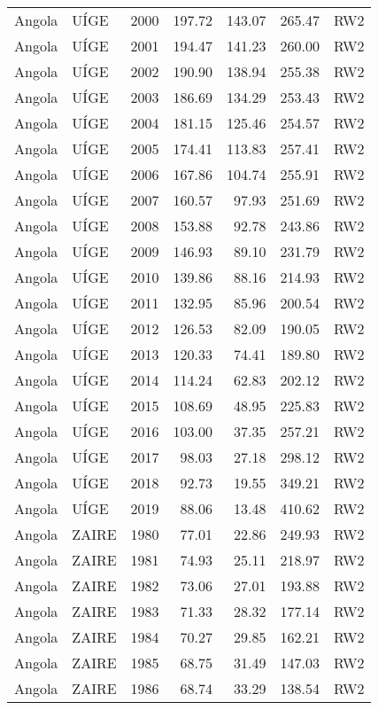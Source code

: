\begin{longtable}{lllrrrl}
  Angola & UÍGE & 2000 & 197.72 & 143.07 & 265.47 & RW2 \\ 
  Angola & UÍGE & 2001 & 194.47 & 141.23 & 260.00 & RW2 \\ 
  Angola & UÍGE & 2002 & 190.90 & 138.94 & 255.38 & RW2 \\ 
  Angola & UÍGE & 2003 & 186.69 & 134.29 & 253.43 & RW2 \\ 
  Angola & UÍGE & 2004 & 181.15 & 125.46 & 254.57 & RW2 \\ 
  Angola & UÍGE & 2005 & 174.41 & 113.83 & 257.41 & RW2 \\ 
  Angola & UÍGE & 2006 & 167.86 & 104.74 & 255.91 & RW2 \\ 
  Angola & UÍGE & 2007 & 160.57 & 97.93 & 251.69 & RW2 \\ 
  Angola & UÍGE & 2008 & 153.88 & 92.78 & 243.86 & RW2 \\ 
  Angola & UÍGE & 2009 & 146.93 & 89.10 & 231.79 & RW2 \\ 
  Angola & UÍGE & 2010 & 139.86 & 88.16 & 214.93 & RW2 \\ 
  Angola & UÍGE & 2011 & 132.95 & 85.96 & 200.54 & RW2 \\ 
  Angola & UÍGE & 2012 & 126.53 & 82.09 & 190.05 & RW2 \\ 
  Angola & UÍGE & 2013 & 120.33 & 74.41 & 189.80 & RW2 \\ 
  Angola & UÍGE & 2014 & 114.24 & 62.83 & 202.12 & RW2 \\ 
  Angola & UÍGE & 2015 & 108.69 & 48.95 & 225.83 & RW2 \\ 
  Angola & UÍGE & 2016 & 103.00 & 37.35 & 257.21 & RW2 \\ 
  Angola & UÍGE & 2017 & 98.03 & 27.18 & 298.12 & RW2 \\ 
  Angola & UÍGE & 2018 & 92.73 & 19.55 & 349.21 & RW2 \\ 
  Angola & UÍGE & 2019 & 88.06 & 13.48 & 410.62 & RW2 \\ 
  Angola & ZAIRE & 1980 & 77.01 & 22.86 & 249.93 & RW2 \\ 
  Angola & ZAIRE & 1981 & 74.93 & 25.11 & 218.97 & RW2 \\ 
  Angola & ZAIRE & 1982 & 73.06 & 27.01 & 193.88 & RW2 \\ 
  Angola & ZAIRE & 1983 & 71.33 & 28.32 & 177.14 & RW2 \\ 
  Angola & ZAIRE & 1984 & 70.27 & 29.85 & 162.21 & RW2 \\ 
  Angola & ZAIRE & 1985 & 68.75 & 31.49 & 147.03 & RW2 \\ 
  Angola & ZAIRE & 1986 & 68.74 & 33.29 & 138.54 & RW2 \\ 

\end{longtable}
